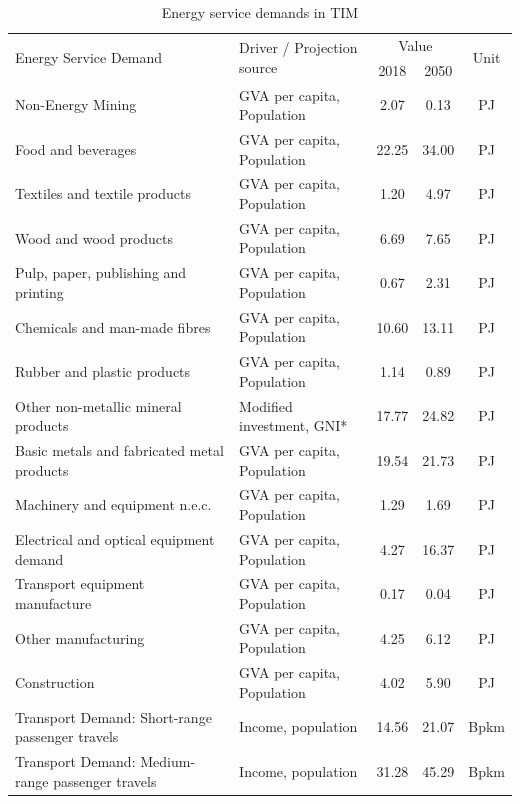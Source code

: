 \documentclass[gmd,manuscript]{copernicus}
\begin{document}
\begin{table}[htbp]
\footnotesize
 \centering
 \caption{Energy service demands in TIM}
 \begin{tabular}{llccc}
 \hline
    \multirow{2}[0]{*}{Energy Service Demand} & \multirow{2}[0]{*}{Driver / Projection source} & \multicolumn{2}{c}{Value} & \multirow{2}[0]{*}{Unit} \\
          &       & \multicolumn{1}{c}{2018} & \multicolumn{1}{c}{2050} &  \\ \hline
    Non-Energy Mining  & GVA per capita, Population & 2.07  & 0.13  & PJ \\
    Food and beverages  & GVA per capita, Population & 22.25 & 34.00 & PJ \\
    Textiles and textile products  & GVA per capita, Population & 1.20  & 4.97  & PJ \\
    Wood and wood products  & GVA per capita, Population & 6.69  & 7.65  & PJ \\
    Pulp, paper, publishing and printing  & GVA per capita, Population & 0.67  & 2.31  & PJ \\
    Chemicals and man-made fibres  & GVA per capita, Population & 10.60 & 13.11 & PJ \\
    Rubber and plastic products  & GVA per capita, Population & 1.14  & 0.89  & PJ \\
    Other non-metallic mineral products  & Modified investment, GNI* & 17.77 & 24.82 & PJ \\
    Basic metals and fabricated metal products  & GVA per capita, Population & 19.54 & 21.73 & PJ \\
    Machinery and equipment n.e.c.  & GVA per capita, Population & 1.29  & 1.69  & PJ \\
    Electrical and optical equipment demand & GVA per capita, Population & 4.27  & 16.37 & PJ \\
    Transport equipment manufacture  & GVA per capita, Population & 0.17  & 0.04  & PJ \\
    Other manufacturing  & GVA per capita, Population & 4.25  & 6.12  & PJ \\
    Construction & GVA per capita, Population & 4.02  & 5.90  & PJ \\
    Transport Demand: Short-range passenger travels & Income, population & 14.56 & 21.07 & Bpkm \\
    Transport Demand: Medium-range passenger travels & Income, population & 31.28 & 45.29 & Bpkm \\

\end{tabular}
\end{table}
\end{document}
